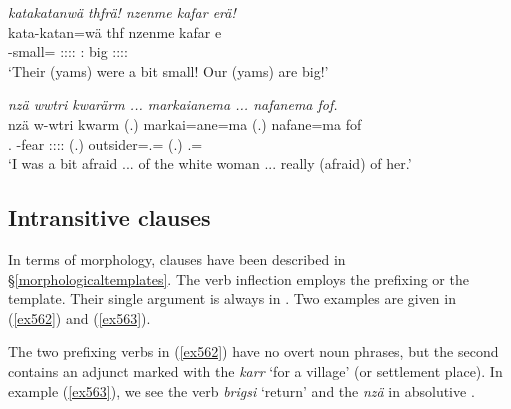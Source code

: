 \begin{exe}
	\ex \emph{katakatanwä thfrä! nzenme kafar erä!}\\
	\gll kata-katan=wä thf nzenme kafar e\\
	\Redup-small=\Emph{} \Tpl:\Sbj:\Rpst:\Ipfv:\Cop{} \Fnsg:\Poss{} big \Tpl:\Sbj:\Nonpast:\Ipfv:\Cop\\
	\trans `Their (yams) were a bit small! Our (yams) are big!'
	\label{ex746}
\end{exe}
\begin{exe}
	\ex \emph{nzä wwtri kwarärm ... markaianema ... nafanema fof.}\\
	\gll nzä w-wtri kwarm (.) markai=ane=ma (.) nafane=ma fof\\
	\Fsg.\Abs{} \Redup-fear \Fsg:\Sbj:\Pst:\Dur:\Cop{} (.) outsider=\Poss.\Sg=\Char{} (.) \Tsg.\Poss=\Char{} \Emph\\
	\trans `I was a bit afraid ... of the white woman ... really (afraid) of her.'\\
	\label{ex747}
\end{exe}

\subsection{Intransitive clauses}\label{intransitiveclauses}

In terms of  morphology,  clauses have been described in \S{}\ref{morphologicaltemplates}. The verb inflection employs the prefixing or the  template. Their single argument is always in  . Two examples are given in (\ref{ex562}) and (\ref{ex563}).%

The two prefixing verbs in (\ref{ex562}) have no overt  noun phrases, but the second  contains an adjunct marked with the   \emph{karr} `for a village' (or settlement place). In example (\ref{ex563}), we see the  verb \emph{brigsi} `return' and the   \emph{nzä} in absolutive .

